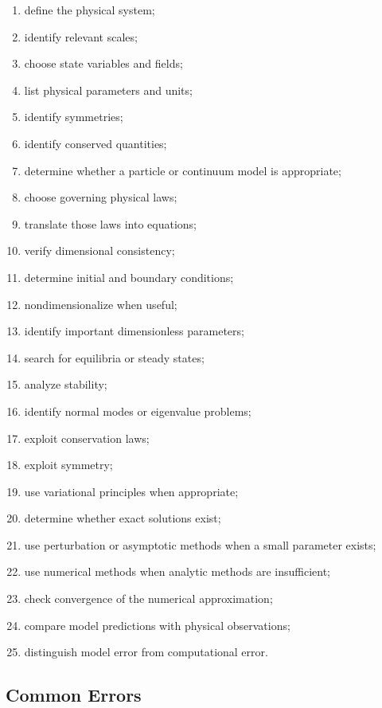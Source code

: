 \begin{enumerate}
    \item define the physical system;
    \item identify relevant scales;
    \item choose state variables and fields;
    \item list physical parameters and units;
    \item identify symmetries;
    \item identify conserved quantities;
    \item determine whether a particle or continuum model is appropriate;
    \item choose governing physical laws;
    \item translate those laws into equations;
    \item verify dimensional consistency;
    \item determine initial and boundary conditions;
    \item nondimensionalize when useful;
    \item identify important dimensionless parameters;
    \item search for equilibria or steady states;
    \item analyze stability;
    \item identify normal modes or eigenvalue problems;
    \item exploit conservation laws;
    \item exploit symmetry;
    \item use variational principles when appropriate;
    \item determine whether exact solutions exist;
    \item use perturbation or asymptotic methods when a small parameter
          exists;
    \item use numerical methods when analytic methods are insufficient;
    \item check convergence of the numerical approximation;
    \item compare model predictions with physical observations;
    \item distinguish model error from computational error.
\end{enumerate}

\subsection{Common Errors}
\label{subsec:mathematical-physics-common-errors}

